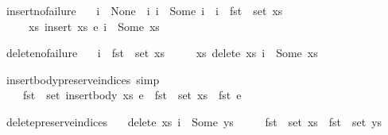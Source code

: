 \documentclass[acmlarge,review,anonymous]{acmart}\settopmatter{printfolios=true}
\begin{document}
\begin{isabellebody}
\isanewline
{}\isamarkupfalse%
\ insert{\isacharunderscore}no{\isacharunderscore}failure{\isacharcolon}\isanewline
\ \ \ {\isachardoublequoteopen}i\ {\isacharequal}\ None\ {\isasymor}\ {\isacharparenleft}{\isasymexists}i{\isacharprime}{\isachardot}\ i\ {\isacharequal}\ Some\ i{\isacharprime}\ {\isasymand}\ i{\isacharprime}\ {\isasymin}\ fst\ {\isacharbackquote}\ set\ xs{\isacharparenright}{\isachardoublequoteclose}\isanewline
\ \ \ \ \ {\isachardoublequoteopen}{\isasymexists}xs{\isacharprime}{\isachardot}\ insert\ xs\ e\ i\ {\isacharequal}\ Some\ xs{\isacharprime}{\isachardoublequoteclose}\isanewline
\end{isabellebody}


\begin{isabellebody}
\isanewline
{}\isamarkupfalse%
\ delete{\isacharunderscore}no{\isacharunderscore}failure{\isacharcolon}\isanewline
\ \ \ {\isachardoublequoteopen}i\ {\isasymin}\ fst\ {\isacharbackquote}\ set\ xs{\isachardoublequoteclose}\isanewline
\ \ \ \ \ {\isachardoublequoteopen}{\isasymexists}xs{\isacharprime}{\isachardot}\ delete\ xs\ i\ {\isacharequal}\ Some\ xs{\isacharprime}{\isachardoublequoteclose}\isanewline
\end{isabellebody}


\begin{isabellebody}
\isanewline
{}\isamarkupfalse%
\ insert{\isacharunderscore}body{\isacharunderscore}preserve{\isacharunderscore}indices\ {\isacharbrackleft}simp{\isacharbrackright}{\isacharcolon}\isanewline
\ \ \ \ {\isachardoublequoteopen}fst\ {\isacharbackquote}\ set\ {\isacharparenleft}insert{\isacharunderscore}body\ xs\ e{\isacharparenright}\ {\isacharequal}\ fst\ {\isacharbackquote}\ set\ xs\ {\isasymunion}\ {\isacharbraceleft}fst\ e{\isacharbraceright}{\isachardoublequoteclose}\isanewline
\end{isabellebody}


\begin{isabellebody}
\isanewline
{}\isamarkupfalse%
\ delete{\isacharunderscore}preserve{\isacharunderscore}indices{\isacharcolon}\isanewline
\ \ \ {\isachardoublequoteopen}delete\ xs\ i\ {\isacharequal}\ Some\ ys{\isachardoublequoteclose}\isanewline
\ \ \ \ \ {\isachardoublequoteopen}fst\ {\isacharbackquote}\ set\ xs\ {\isacharequal}\ fst\ {\isacharbackquote}\ set\ ys{\isachardoublequoteclose}\isanewline
\end{isabellebody}
\end{document}
